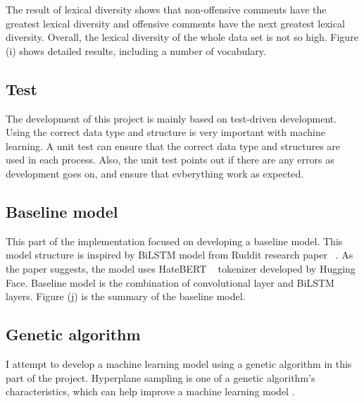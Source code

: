 \documentclass[11pt, natbib=false]{article}
\begin{document}
The result of lexical diversity shows that non-offensive comments have the greatest lexical diversity and offensive comments have the next greatest lexical diversity.
Overall, the lexical diversity of the whole data set is not so high.
Figure (i) shows detailed results, including a number of vocabulary.

\subsection{Test}
The development of this project is mainly based on test-driven development.
Using the correct data type and structure is very important with machine learning.
A unit test can ensure that the correct data type and structures are used in each process.
Also, the unit test points out if there are any errors as development goes on, and ensure that evberything work as expected.

\subsection{Baseline model}
This part of the implementation focused on developing a baseline model.
This model structure is inspired by BiLSTM model from Ruddit research paper ~\cite{hada2021ruddit}.
As the paper suggests, the model uses HateBERT ~\cite{caselli2020hatebert} tokenizer developed by Hugging Face.
Baseline model is the combination of convolutional layer and BiLSTM layers.
Figure (j) is the summary of the baseline model.

\subsection{Genetic algorithm}
I attempt to develop a machine learning model using a genetic algorithm in this part of the project.
Hyperplane sampling is one of a genetic algorithm's characteristics, which can help improve a machine learning model .
\end{document}
